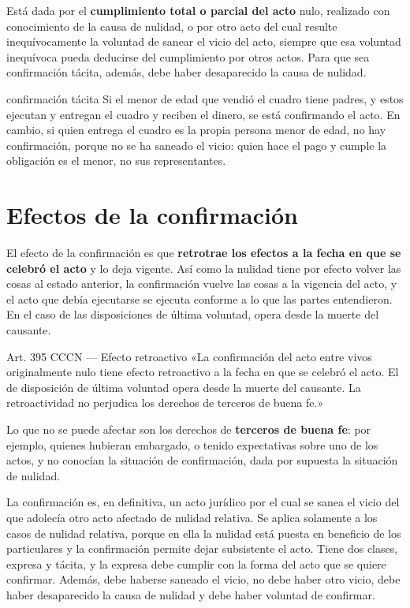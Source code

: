 \documentclass[12pt,oneside]{book}
\begin{document}
Está dada por el \textbf{cumplimiento total o parcial del acto} nulo, realizado con conocimiento de la causa de nulidad, o por otro acto del cual resulte inequívocamente la voluntad de sanear el vicio del acto, siempre que esa voluntad inequívoca pueda deducirse del cumplimiento por otros actos. Para que sea confirmación tácita, además, debe haber desaparecido la causa de nulidad.

\begin{example}{confirmación tácita}
Si el menor de edad que vendió el cuadro tiene padres, y estos ejecutan y entregan el cuadro y reciben el dinero, se está confirmando el acto. En cambio, si quien entrega el cuadro es la propia persona menor de edad, no hay confirmación, porque no se ha saneado el vicio: quien hace el pago y cumple la obligación es el menor, no sus representantes.
\end{example}

\section{Efectos de la confirmación}

El efecto de la confirmación es que \textbf{retrotrae los efectos a la fecha en que se celebró el acto} y lo deja vigente. Así como la nulidad tiene por efecto volver las cosas al estado anterior, la confirmación vuelve las cosas a la vigencia del acto, y el acto que debía ejecutarse se ejecuta conforme a lo que las partes entendieron. En el caso de las disposiciones de última voluntad, opera desde la muerte del causante.

\begin{articulo}{Art. 395 CCCN --- Efecto retroactivo}
«La confirmación del acto entre vivos originalmente nulo tiene efecto retroactivo a la fecha en que se celebró el acto. El de disposición de última voluntad opera desde la muerte del causante. La retroactividad no perjudica los derechos de terceros de buena fe.»
\end{articulo}

Lo que no se puede afectar son los derechos de \textbf{terceros de buena fe}: por ejemplo, quienes hubieran embargado, o tenido expectativas sobre uno de los actos, y no conocían la situación de confirmación, dada por supuesta la situación de nulidad.

La confirmación es, en definitiva, un acto jurídico por el cual se sanea el vicio del que adolecía otro acto afectado de nulidad relativa. Se aplica solamente a los casos de nulidad relativa, porque en ella la nulidad está puesta en beneficio de los particulares y la confirmación permite dejar subsistente el acto. Tiene dos clases, expresa y tácita, y la expresa debe cumplir con la forma del acto que se quiere confirmar. Además, debe haberse saneado el vicio, no debe haber otro vicio, debe haber desaparecido la causa de nulidad y debe haber voluntad de confirmar.
\end{document}
